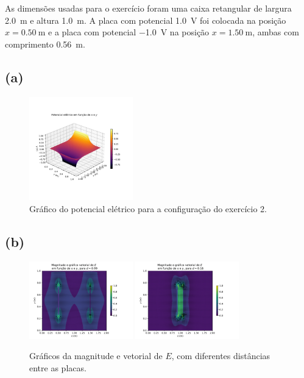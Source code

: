 \documentclass[a4paper, brazil]{article}
\begin{document}
As dimensões usadas para o exercício foram uma caixa retangular de largura \SI{2.0}{\meter} e altura \SI{1.0}{\meter}.
A placa com potencial \SI{1.0}{\volt} foi colocada na posição \( x = \SI{0.50}{\meter} \) e a placa com potencial \SI{-1.0}{\volt} na posição \( x = \SI{1.50}{\meter} \), ambas com comprimento \SI{0.56}{\meter}.

\subsection{(a)}

\begin{figure}[ht]
\centering
\includegraphics[width=0.4\textwidth]{imagem2_V2.pdf}
\caption{Gráfico do potencial elétrico para a configuração do exercício 2.}\label{fig2a}
\end{figure}

\subsection{(b)}

\begin{figure}[ht]
\centering
\includegraphics[width=0.4\textwidth]{imagem2_E2.pdf}
\includegraphics[width=0.4\textwidth]{imagem2_E2b.pdf}
\caption{Gráficos da magnitude e vetorial de \( E \), com diferentes distâncias entre as placas.}\label{fig2b}
\end{figure}
\end{document}
